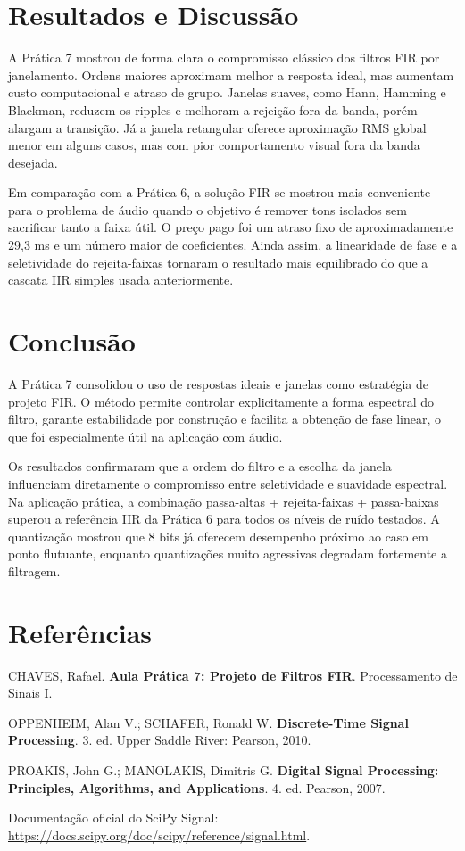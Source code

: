 \documentclass[12pt,a4paper]{article}
\begin{document}
\section*{Resultados e Discussão}
A Prática 7 mostrou de forma clara o compromisso clássico dos filtros FIR por janelamento. Ordens maiores aproximam melhor a resposta ideal, mas aumentam custo computacional e atraso de grupo. Janelas suaves, como Hann, Hamming e Blackman, reduzem os ripples e melhoram a rejeição fora da banda, porém alargam a transição. Já a janela retangular oferece aproximação RMS global menor em alguns casos, mas com pior comportamento visual fora da banda desejada.

Em comparação com a Prática 6, a solução FIR se mostrou mais conveniente para o problema de áudio quando o objetivo é remover tons isolados sem sacrificar tanto a faixa útil. O preço pago foi um atraso fixo de aproximadamente 29,3 ms e um número maior de coeficientes. Ainda assim, a linearidade de fase e a seletividade do rejeita-faixas tornaram o resultado mais equilibrado do que a cascata IIR simples usada anteriormente.

\section*{Conclusão}
A Prática 7 consolidou o uso de respostas ideais e janelas como estratégia de projeto FIR. O método permite controlar explicitamente a forma espectral do filtro, garante estabilidade por construção e facilita a obtenção de fase linear, o que foi especialmente útil na aplicação com áudio.

Os resultados confirmaram que a ordem do filtro e a escolha da janela influenciam diretamente o compromisso entre seletividade e suavidade espectral. Na aplicação prática, a combinação passa-altas + rejeita-faixas + passa-baixas superou a referência IIR da Prática 6 para todos os níveis de ruído testados. A quantização mostrou que 8 bits já oferecem desempenho próximo ao caso em ponto flutuante, enquanto quantizações muito agressivas degradam fortemente a filtragem.

\section*{Referências}
CHAVES, Rafael. \textbf{Aula Prática 7: Projeto de Filtros FIR}. Processamento de Sinais I.

OPPENHEIM, Alan V.; SCHAFER, Ronald W. \textbf{Discrete-Time Signal Processing}. 3. ed. Upper Saddle River: Pearson, 2010.

PROAKIS, John G.; MANOLAKIS, Dimitris G. \textbf{Digital Signal Processing: Principles, Algorithms, and Applications}. 4. ed. Pearson, 2007.

Documentação oficial do SciPy Signal: \url{https://docs.scipy.org/doc/scipy/reference/signal.html}.
\end{document}
